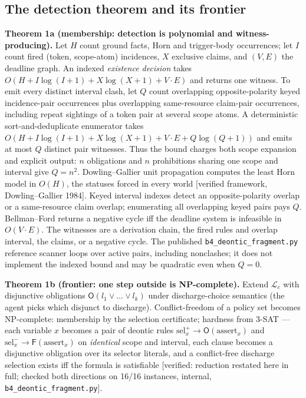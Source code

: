 \documentclass[11pt,a4paper]{article}
\newcommand{\Ob}{\mathsf{O}}
\newcommand{\Fb}{\mathsf{F}}
\begin{document}
\subsection*{The detection theorem and its frontier}
\begin{thebox}
\textbf{Theorem 1a (membership: detection is polynomial and witness-producing).} Let $H$ count ground facts, Horn and
trigger-body occurrences; let $I$ count fired (token, scope-atom) incidences, $X$ exclusive claims, and $(V,E)$ the deadline
graph. An indexed \emph{existence decision} takes $O(H+I\log(I+1)+X\log(X+1)+V\!\cdot\!E)$ and returns one witness. To
emit every distinct interval clash, let $Q$ count overlapping opposite-polarity keyed incidence-pair occurrences plus
overlapping same-resource claim-pair occurrences, including repeat sightings of a token pair at several scope atoms. A
deterministic sort-and-deduplicate enumerator takes
$O(H+I\log(I+1)+X\log(X+1)+V\!\cdot\!E+Q\log(Q+1))$ and emits at most $Q$ distinct pair witnesses. Thus the bound
charges both scope expansion and explicit output: $n$ obligations and $n$ prohibitions sharing one scope and interval give
$Q=n^2$. Dowling--Gallier unit propagation computes the least Horn model in $O(H)$, the statuses forced in every world
[verified framework, Dowling--Gallier 1984]. Keyed interval indexes detect an opposite-polarity overlap or a same-resource
claim overlap; enumerating all overlapping keyed pairs pays $Q$. Bellman--Ford returns a negative cycle iff the deadline
system is infeasible in $O(V\!\cdot\!E)$. The witnesses are a derivation chain, the fired rules and overlap interval, the
claims, or a negative cycle. The published \texttt{b4\_deontic\_fragment.py} reference scanner loops over active pairs,
including nonclashes; it does not implement the indexed bound and may be quadratic even when $Q=0$.

\textbf{Theorem 1b (frontier: one step outside is NP-complete).} Extend $\mathcal{L}_c$ with disjunctive obligations
$\Ob(l_1\vee\dots\vee l_k)$ under discharge-choice semantics (the agent picks which disjunct to discharge). Conflict-freedom of a
policy set becomes NP-complete: membership by the selection certificate; hardness from 3-SAT --- each variable $x$ becomes a pair
of deontic rules $\mathrm{sel}_x^{+} \to \Ob(\mathrm{assert}_x)$ and $\mathrm{sel}_x^{-} \to \Fb(\mathrm{assert}_x)$ on
\emph{identical} scope and interval, each clause becomes a disjunctive obligation over its selector literals, and a conflict-free
discharge selection exists iff the formula is satisfiable [verified: reduction restated here in full; checked both directions on
16/16 instances, internal, \texttt{b4\_deontic\_fragment.py}].
\end{thebox}
\end{document}
